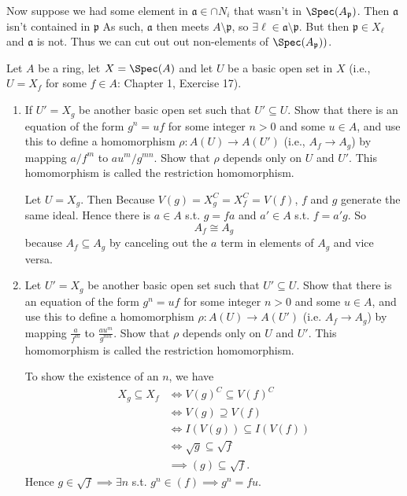 \begin{questions}
\begin{solution}
	Now suppose we had some element in $\mathfrak{a} \in \cap N_i $ that wasn't in $\Spec(A_{\mathfrak{p}}) $.
	Then $\mathfrak{a} $ isn't contained in $\mathfrak{p} $
	As such, $\mathfrak{a} $ then meets $A \setminus \mathfrak{p} $, so $\exists \ell \in \mathfrak{a} \setminus \mathfrak{p} $.
	But then $\mathfrak{p} \in X_{\ell} $ and $\mathfrak{a} $ is not.
	Thus we can cut out out non-elements of $\Spec(A_{\mathfrak{p}})) $.
\end{solution}

\question Let $A $ be a ring, let $X = \Spec(A) $ and let $U$ be a basic open set in $X $ (i.e., $U = X_f $ for some $f \in A $: Chapter 1, Exercise 17).
\begin{enumerate}
\item If $U' = X_g $ be another basic open set such that $U' \subseteq U $. Show that there is an equation of the form $g^n = uf $ for some integer $n>0 $ and some $u \in A $, and use this to define a homomorphism $\rho: A(U) \to A(U') $ (i.e., $A_f \to A_g $) by mapping $a / f^m $ to $au^m / g^{mn}  $. Show that $\rho $ depends only on $U $ and $U' $. This homomorphism is called the restriction homomorphism.
\begin{solution}
	Let $U = X_g $.
	Then Because $V(g) = X_g^C = X_f^C = V(f) $, $f $ and $g $ generate the same ideal.
	Hence there is $a\in A $ s.t. $g = fa $ and $a' \in A $ s.t. $f = a'g $.
	So
	\[
		A_{f} \cong A_{g}
	\] 
	because $A_f \subseteq A_g $ by canceling out the $a $ term in elements of $A_g $ and vice versa.
\end{solution}
\item Let $U' = X_g $ be another basic open set such that $U' \subseteq U $. Show that there is an equation of the form $g^n = uf $ for some integer $n > 0 $ and some $u\in A $, and use this to define a homomorphism $\rho: A(U) \to A(U') $ (i.e. $A_f \to A_g $) by mapping $\frac{a}{f^m} $ to $\frac{au^m}{g^{mn} } $. Show that $\rho $ depends only on $U $ and $U' $. This homomorphism is called the restriction homomorphism.
\begin{solution}
	To show the existence of an $n $, we have
	\begin{align*}
		X_g \subseteq X_f &\iff V(g)^C \subseteq V(f)^C\\
				  &\iff V(g) \supseteq V(f)\\
				  &\iff I(V(g)) \subseteq I(V(f))\\
				  &\iff \sqrt{g}  \subseteq \sqrt{f}  \tag{Nullstellensatz}\\
				  &\implies (g) \subseteq \sqrt{f} 
	.\end{align*}
	Hence $g\in \sqrt{f}  \implies \exists n$ s.t. $g^n \in (f) \implies g^n = fu $.


\end{solution}
\end{enumerate}
\end{questions}
